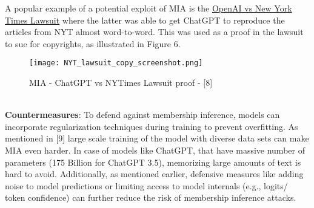 \documentclass[12pt]{article}
\begin{document}
\begin{itemize}
        A popular example of a potential exploit of MIA is the \href{https://www.nytimes.com/2023/12/27/business/media/new-york-times-open-ai-microsoft-lawsuit.html}{OpenAI vs New York Times Lawsuit} where the latter was able to get ChatGPT to reproduce the articles from NYT almost word-to-word. This was used as a proof in the lawsuit to sue for copyrights, as illustrated in Figure 6.
        \begin{figure}[h!]
            \centering
            \texttt{[image: NYT\_lawsuit\_copy\_screenshot.png]}
            \caption{MIA - ChatGPT vs NYTimes Lawsuit proof - [8]}
            \label{fig:enter-label}
        \end{figure}\\
        \textbf{Countermeasures}: To defend against membership inference, models can incorporate regularization techniques during training to prevent overfitting. As mentioned in [9] large scale training of the model with diverse data sets can make MIA even harder. In case of models like ChatGPT, that have massive number of parameters (175 Billion for ChatGPT 3.5), memorizing large amounts of text is hard to avoid. Additionally, as mentioned earlier, defensive measures like adding noise to model predictions or limiting access to model internals (e.g., logits/ token confidence) can further reduce the risk of membership inference attacks.
    \end{itemize}
\end{document}

